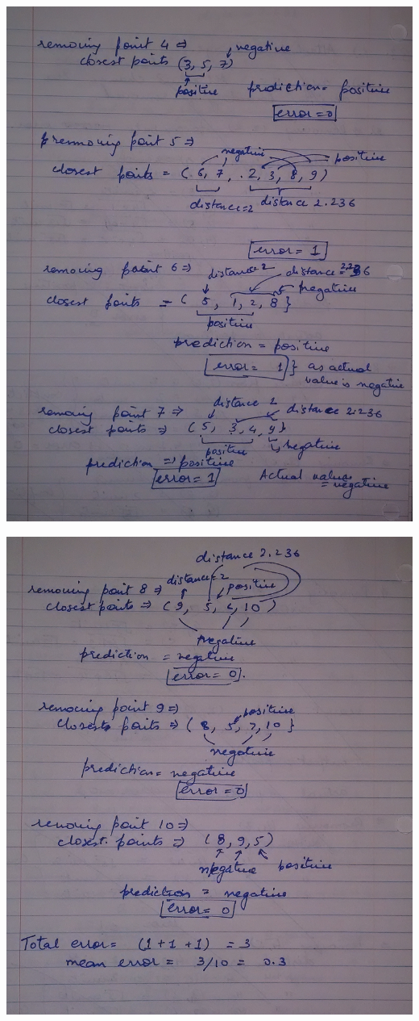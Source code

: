 \documentclass[letterpaper]{article}
\begin{document}
\begin{center}
\includegraphics[width = 6in]{10.png}
\end{center}

\begin{center}
\includegraphics[width = 6in]{11.png}
\end{center}
\end{document}
